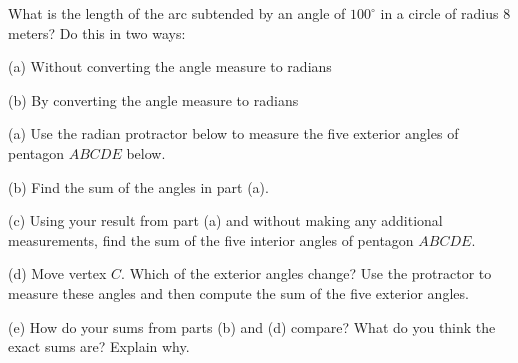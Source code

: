 \documentclass{ximera}
\begin{document}
\begin{question} \label{Q873:Radians}
What is the length of the arc subtended by an angle of $100^\circ$ in a circle of radius $8$ meters? Do this in two ways:

(a) Without converting the angle measure to radians

(b) By converting the angle measure to radians
\end{question}



\begin{exploration}  \label{Q111:Radians}
(a) Use the radian protractor below to measure the five exterior angles of pentagon $ABCDE$ below.

(b) Find the sum of the angles in part (a).

(c) Using your result from part (a) and without making any additional measurements, find the sum of the five interior angles of pentagon $ABCDE$.

(d) Move vertex $C$. Which of the exterior angles change? Use the protractor to measure these angles and then compute the sum of the five exterior angles.

(e) How do your sums from parts (b) and (d) compare? What do you think the exact sums are? Explain why.


 
\begin{onlineOnly}
    \begin{center}
\end{center}
\end{onlineOnly}
\end{exploration}
\end{document}
